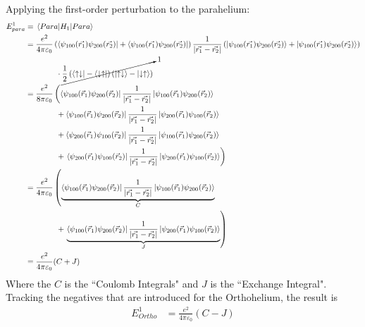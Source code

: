 \documentclass[11pt]{article}
\begin{document}
Applying the first-order perturbation to the parahelium:
\begin{align*}
E^1_{para} & = \ev{H_1}{Para}\\
& = \frac{e^2}{4\pi\varepsilon_0}\left(\bra{\psi_{100}(\vec{r_1})\psi_{200}(\vec{r_2})} + \bra{\psi_{100}(\vec{r_1})\psi_{200}(\vec{r_2})}\right)\frac{1}{\left|\vec{r_1} - \vec{r_2}\right|}\left(\ket{\psi_{100}(\vec{r_1})\psi_{200}(\vec{r_2})} + \ket{\psi_{100}(\vec{r_1})\psi_{200}(\vec{r_2})}\right)\\
& \hspace{4em} \cdot \cancelto{1}{\frac{1}{2}\left(\bra{\uparrow\downarrow} - \bra{\downarrow\uparrow}\right)\left(\ket{\uparrow\downarrow} - \ket{\downarrow\uparrow}\right)}\\
& = \frac{e^2}{8\pi\varepsilon_0}\left(\bra{\psi_{100}(\vec{r}_1)\psi_{200}(\vec{r}_2)}\frac{1}{\left|\vec{r_1} - \vec{r_2}\right|}\ket{\psi_{100}(\vec{r}_1)\psi_{200}(\vec{r}_2)} \right.\\
& \hspace{4em} + \bra{\psi_{100}(\vec{r}_1)\psi_{200}(\vec{r}_2)}\frac{1}{\left|\vec{r_1} - \vec{r_2}\right|}\ket{\psi_{200}(\vec{r}_1)\psi_{100}(\vec{r}_2)} \\
& \hspace{4em} + \bra{\psi_{200}(\vec{r}_1)\psi_{100}(\vec{r}_2)}\frac{1}{\left|\vec{r_1} - \vec{r_2}\right|}\ket{\psi_{100}(\vec{r}_1)\psi_{200}(\vec{r}_2)} \\
& \hspace{4em} + \left. \bra{\psi_{200}(\vec{r}_1)\psi_{100}(\vec{r}_2)}\frac{1}{\left|\vec{r_1} - \vec{r_2}\right|}\ket{\psi_{200}(\vec{r}_1)\psi_{100}(\vec{r}_2)}\right)\\
& = \frac{e^2}{4\pi\varepsilon_0}\left(\underbrace{\bra{\psi_{100}(\vec{r}_1)\psi_{200}(\vec{r}_2)}\frac{1}{\left|\vec{r_1} - \vec{r_2}\right|}\ket{\psi_{100}(\vec{r}_1)\psi_{200}(\vec{r}_2)}}_C \right. \\
&  \hspace{4em} + \left.\underbrace{\bra{\psi_{100}(\vec{r}_1)\psi_{200}(\vec{r}_2)}\frac{1}{\left|\vec{r_1} - \vec{r_2}\right|}\ket{\psi_{200}(\vec{r}_1)\psi_{100}(\vec{r}_2)}}_J\right)\\
& = \frac{e^2}{4\pi\varepsilon_0}(C + J)
\end{align*}
Where the $C$ is the ``Coulomb Integrals" and $J$ is the ``Exchange Integral". Tracking the negatives that are introduced for the Orthohelium, the result is
\begin{align*}
E^1_{Ortho} & = \frac{e^2}{4\pi\varepsilon_0}(C - J)
\end{align*} 
\end{document}
